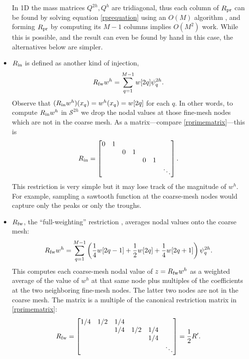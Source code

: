 \documentclass[letterpaper,final,12pt,reqno]{amsart}
\begin{document}
\begin{itemize}
In 1D the mass matrices $Q^{2h},Q^h$ are tridiagonal, thus each column of $R_{\text{pr}}$ can be found by solving equation \eqref{rprequation} using an $O(M)$ algorithm \cite{TrefethenBau1997}, and forming $R_{\text{pr}}$ by computing its $M-1$ columns implies $O(M^2)$ work.  While this is possible, and the result can even be found by hand in this case, the alternatives below are simpler.
\item $R_{\text{in}}$ is defined as another kind of injection,
\begin{equation}
  R_{\text{fw}} w^h = \sum_{q=1}^{M-1} w[2q] \psi_q^{2h}. \label{rindefinition}
\end{equation}
Observe that $(R_{\text{in}} w^h)(x_q) = w^h(x_q) = w[2q]$ for each $q$.  In other words, to compute $R_{\text{in}} w^h$ in $\mathcal{S}^{2h}$ we drop the nodal values at those fine-mesh nodes which are not in the coarse mesh.  As a matrix---compare \eqref{rprimematrix}---this is
\begin{equation}
R_{\text{in}} = \begin{bmatrix}
0 & 1 &   &   &   &   &\\
  &   & 0 & 1 &   &   & \\
  &   &   &   & 0 & 1 & \\
  &   &   &   &   &   & \ddots
\end{bmatrix}. \label{rinmatrix}
\end{equation}
This restriction is very simple but it may lose track of the magnitude of $w^h$.  For example, sampling a sawtooth function at the coarse-mesh nodes would capture only the peaks or only the troughs.
\item $R_{\text{fw}}$, the ``full-weighting'' restriction \cite{Briggsetal2000}, averages nodal values onto the coarse mesh:
\begin{equation}
  R_{\text{fw}} w^h = \sum_{q=1}^{M-1} \left(\frac{1}{4} w[2q-1] + \frac{1}{2} w[2q] + \frac{1}{4} w[2q+1]\right) \psi_q^{2h}. \label{rfwdefinition}
\end{equation}
This computes each coarse-mesh nodal value of $z=R_{\text{fw}} w^h$ as a weighted average of the value of $w^h$ at that same node plus multiples of the coefficients at the two neighboring fine-mesh nodes.  The latter two nodes are not in the coarse mesh.  The matrix is a multiple of the canonical restriction matrix in \eqref{rprimematrix}:
\begin{equation}
R_{\text{fw}} = \begin{bmatrix}
1/4 & 1/2 & 1/4 &     &     &  \\
    &     & 1/4 & 1/2 & 1/4 &  \\
    &     &     &     & 1/4 &  \\
    &     &     &     &     & \ddots
\end{bmatrix} = \frac{1}{2} R'. \label{rfwmatrix}
\end{equation}
\end{itemize}
\end{document}
